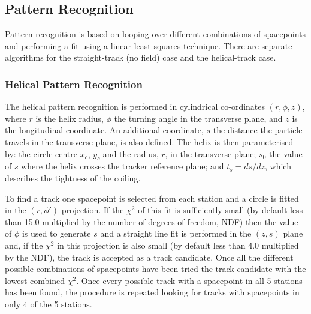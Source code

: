 
  \subsection{Pattern Recognition}
  \label{subsec:PatternRecognition}

  Pattern recognition is based on looping over different combinations of spacepoints and performing a fit using a linear-least-squares technique. There are separate algorithms for the straight-track (no field) case and the helical-track case.

   \subsubsection{Helical Pattern Recognition}
   \label{subsubsec:HelicalPatternRecognition}

   
   The helical pattern recognition is performed in cylindrical co-ordinates $(r, \phi, z)$, where $r$ is the helix radius, $\phi$ the turning angle in the transverse plane, and $z$ is the longitudinal coordinate. An additional coordinate, $s$ the distance the particle travels in the transverse plane, is also defined. The helix is then parameterised by: the circle centre $x_c$, $y_c$ and the radius, $r$, in the transverse plane; $s_0$ the value of $s$ where the helix crosses the tracker reference plane; and $t_s = ds/dz$, which describes the tightness of the coiling. %

   To find a track one spacepoint is selected from each station and a circle is fitted in the $(r, \phi')$ projection. If the $\chi^2$ of this fit is sufficiently small (by default less than 15.0 multiplied by the number of degrees of freedom, NDF) then the value of $\phi$ is used to generate $s$ and a straight line fit is performed in the $(z,s)$ plane and, if the $\chi^2$ in this projection is also small (by default less than 4.0 multiplied by the NDF), the track is accepted as a track candidate. Once all the different possible combinations of spacepoints have been tried the track candidate with the lowest combined $\chi^2$. Once every possible track with a spacepoint in all 5 stations has been found, the procedure is repeated looking for tracks with spacepoints in only 4 of the 5 stations. %
   
